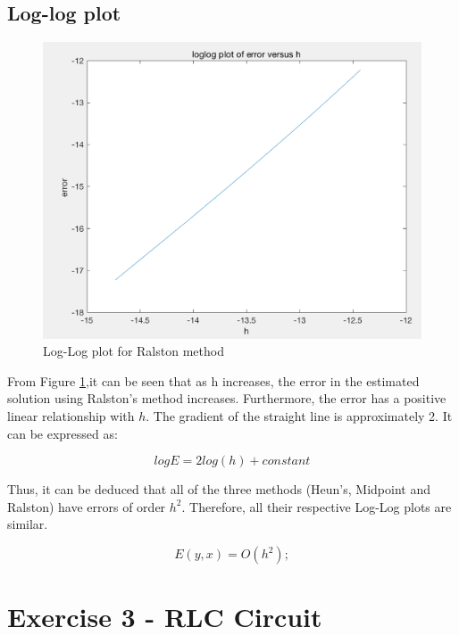 \documentclass[11pt,a4paper]{article}
\begin{document}
\pagebreak

\subsection{Log-log plot}
\begin{figure}[h]
    \centering
    \includegraphics[scale=0.5]{Ex2_Figs/errorloglogfinal1}
    \caption{Log-Log plot for Ralston method}
    \label{fig:heun_error_loglog} %
\end{figure}

From Figure \ref{fig:heun_error_loglog},it can be seen that as h increases, the error in the estimated solution using Ralston's method increases. Furthermore, the error has a positive linear relationship with $h$. The gradient of the straight line is approximately 2. It can be expressed as:

\begin{equation}
logE=2log(h)+constant
\end{equation}

Thus, it can be deduced that all of the three methods (Heun's, Midpoint and Ralston) have errors of order $h^2$. Therefore, all their respective Log-Log plots are similar.

\begin{equation}
E(y,x)=O(h^2);
\end{equation}



\pagebreak
\section{Exercise 3 - RLC Circuit}\vspace{-1mm}
\end{document}
